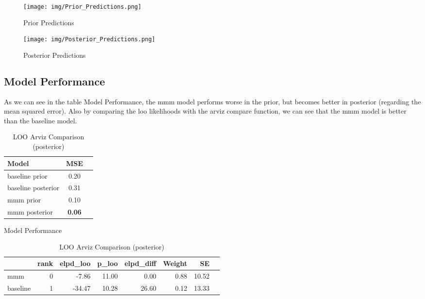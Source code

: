 \documentclass{article}
\begin{document}
\begin{figure}[H] %
    \centering
    \begin{minipage}[t]{0.48\textwidth}
        \centering
        \texttt{[image: img/Prior\_Predictions.png]}
        \caption{Prior Predictions}
        \label{fig:prior_predictions}
    \end{minipage}
    \hfill %
    \begin{minipage}[t]{0.48\textwidth}
        \centering
        \texttt{[image: img/Posterior\_Predictions.png]}
        \caption{Posterior Predictions}
        \label{fig:posterior_predictions}
    \end{minipage}
\end{figure}

\subsection{Model Performance}

As we can see in the table Model Performance, the mmm model performs worse in the prior, but becomes better in posterior (regarding the mean squared error).
Also by comparing the loo likelihoods with the arviz compare function, we can see that the mmm model is better than the baseline model.
\begin{table}[h!]
    \small
    \centering
    \begin{minipage}[t]{0.3\textwidth}
        \centering
        \begin{tabular}{lcc}
        \toprule
        \textbf{Model} & \textbf{MSE} \\
        \midrule
        baseline prior   & 0.20 \\
        baseline posterior   & 0.31 \\
        mmm prior  & 0.10 \\
        mmm posterior  & \textbf{0.06} \\
        \bottomrule
        \end{tabular}
        \caption{Model Performance}
        \label{tab:model_performance}
    \end{minipage}
    \hfill %
    \begin{minipage}[t]{0.65\textwidth}
        \centering
        \begin{tabular}{lrrrrrrr}
            \toprule
            & \textbf{rank} & \textbf{elpd\_loo} & \textbf{p\_loo} & \textbf{elpd\_diff} & \textbf{Weight} & \textbf{SE} \\
            \midrule
            mmm & 0 & -7.86 & 11.00 & 0.00 & 0.88 & 10.52 \\
            baseline & 1 & -34.47 & 10.28 & 26.60 & 0.12 & 13.33 \\
            \bottomrule
        \end{tabular}
        \caption{LOO Arviz Comparison (posterior)}
        \label{tab:loo_arviz_comparison}
    \end{minipage}
\end{table}
\end{document}
